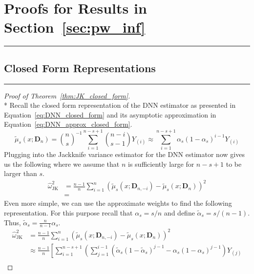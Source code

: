 \section{Proofs for Results in Section~\ref{sec:pw_inf}}
\hrule

\subsection{Closed Form Representations}
\hrule

\begin{proof}[Proof of Theorem~\ref{thm:JK_closed_form}]\mbox{}\\*
	Recall the closed form representation of the DNN estimator as presented in Equation~\ref{eq:DNN_closed_form} and its asymptotic approximation in Equation~\ref{eq:DNN_approx_closed_form}.
	\begin{equation}
		\tilde{\mu}_{s}(x; \mathbf{D}_n)
		= \binom{n}{s}^{-1} \sum_{i = 1}^{n - s + 1}\binom{n - i}{s - 1}Y_{(i)}
		\approx \sum_{i = 1}^{n - s + 1} \alpha_{s} {\left(1 - \alpha_{s}\right)}^{i - 1} Y_{(i)}
	\end{equation}
	Plugging into the Jackknife variance estimator for the DNN estimator now gives us the following where we assume that $n$ is sufficiently large for $n - s + 1$ to be larger than $s$.
	\begin{equation}
		\begin{aligned}
			\hat{\omega}_{\text{JK}}^{2}
			 & = \frac{n - 1}{n}\sum_{i = 1}^{n} {\left(\tilde{\mu}_{s}(x; \mathbf{D}_{n, -i}) - \tilde{\mu}_{s}(x; \mathbf{D}_n)\right)}^2 \\
			 & =
		\end{aligned}
	\end{equation}
	Even more simple, we can use the approximate weights to find the following representation.
	For this purpose recall that $\alpha_{s} = s/n$ and define $\tilde{\alpha}_s = s/(n-1)$.
	Thus, $\tilde{\alpha}_s = \frac{n}{n-1}\alpha_{s}$.
	\begin{equation}
		\begin{aligned}
			\hat{\omega}_{\text{JK}}^{2}
			 & = \frac{n - 1}{n}\sum_{i = 1}^{n} {\left(\tilde{\mu}_{s}(x; \mathbf{D}_{n, -i}) - \tilde{\mu}_{s}(x; \mathbf{D}_n)\right)}^2 \\
			 & \approx \frac{n - 1}{n} \left[
				\sum_{i = 1}^{n - s + 1} \left(
				\sum_{j = 1}^{i - 1}\left(\tilde{\alpha}_{s}{\left(1 - \tilde{\alpha}_{s}\right)}^{j - 1} - \alpha_{s}{\left(1 - \alpha_{s}\right)}^{j - 1}
				\right) Y_{(j)} \right. \right.\\

\end{aligned}
\end{equation}
\end{proof}

